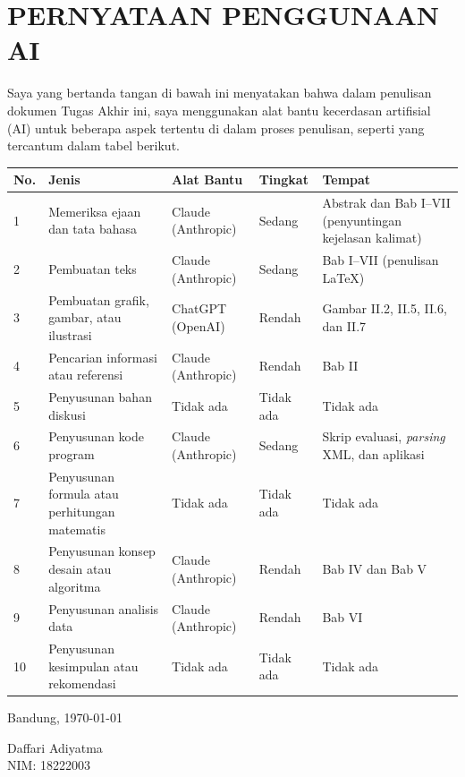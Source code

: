 \chapter*{PERNYATAAN PENGGUNAAN AI}

Saya yang bertanda tangan di bawah ini menyatakan bahwa dalam penulisan dokumen Tugas Akhir ini,
saya menggunakan alat bantu kecerdasan artifisial (AI) untuk beberapa aspek tertentu di dalam proses penulisan,
seperti yang tercantum dalam tabel berikut.

\begin{center}
\footnotesize
\singlespacing
\renewcommand{\arraystretch}{1.1}
\begin{tabular}{|p{0.8cm}| p{3.6cm} | p{2.2cm} | p{2.0cm} | p{2.8cm} @{}| }
\hline
\textbf{No.} & \textbf{Jenis} & \textbf{Alat Bantu} & \textbf{Tingkat} & \textbf{Tempat}\\
\hline
1 & Memeriksa ejaan dan tata bahasa & Claude (Anthropic) & Sedang & Abstrak dan Bab I--VII (penyuntingan kejelasan kalimat) \\
\hline
2 & Pembuatan teks & Claude (Anthropic) & Sedang & Bab I--VII (penulisan LaTeX) \\
\hline
3 & Pembuatan grafik, gambar, atau ilustrasi & ChatGPT (OpenAI) & Rendah & Gambar II.2, II.5, II.6, dan II.7 \\
\hline
4 & Pencarian informasi atau referensi & Claude (Anthropic) & Rendah & Bab II \\
\hline
5 & Penyusunan bahan diskusi & Tidak ada & Tidak ada & Tidak ada \\
\hline
6 & Penyusunan kode program & Claude (Anthropic) & Sedang & Skrip evaluasi, \textit{parsing} XML, dan aplikasi \\
\hline
7 & Penyusunan formula atau perhitungan matematis & Tidak ada & Tidak ada & Tidak ada \\
\hline
8 & Penyusunan konsep desain atau algoritma & Claude (Anthropic) & Rendah & Bab IV dan Bab V \\
\hline
9 & Penyusunan analisis data & Claude (Anthropic) & Rendah & Bab VI \\
\hline
10 & Penyusunan kesimpulan atau rekomendasi & Tidak ada & Tidak ada & Tidak ada \\
\hline
\end{tabular}
\end{center}

\vspace{0.6cm}

\begin{minipage}{\textwidth}
\singlespacing
Bandung, \today

\vspace{1.6cm}

Daffari Adiyatma \\
NIM: 18222003
\end{minipage}